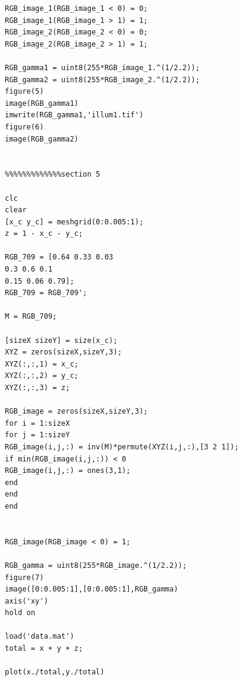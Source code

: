 \documentclass[paper=a4, fontsize=11pt]{scrartcl} %
\numberwithin{equation}{section} %
\numberwithin{figure}{section} %
\numberwithin{table}{section} %
\begin{document}
\begin{lstlisting}[frame=single]
RGB_image_1(RGB_image_1 < 0) = 0;
RGB_image_1(RGB_image_1 > 1) = 1;
RGB_image_2(RGB_image_2 < 0) = 0;
RGB_image_2(RGB_image_2 > 1) = 1;

RGB_gamma1 = uint8(255*RGB_image_1.^(1/2.2));
RGB_gamma2 = uint8(255*RGB_image_2.^(1/2.2));
figure(5)
image(RGB_gamma1)
imwrite(RGB_gamma1,'illum1.tif')
figure(6)
image(RGB_gamma2)


%%%%%%%%%%%%%section 5

clc
clear
[x_c y_c] = meshgrid(0:0.005:1);
z = 1 - x_c - y_c;

RGB_709 = [0.64 0.33 0.03
0.3 0.6 0.1
0.15 0.06 0.79];
RGB_709 = RGB_709';

M = RGB_709;

[sizeX sizeY] = size(x_c);
XYZ = zeros(sizeX,sizeY,3);
XYZ(:,:,1) = x_c;
XYZ(:,:,2) = y_c;
XYZ(:,:,3) = z;

RGB_image = zeros(sizeX,sizeY,3);
for i = 1:sizeX
for j = 1:sizeY
RGB_image(i,j,:) = inv(M)*permute(XYZ(i,j,:),[3 2 1]);
if min(RGB_image(i,j,:)) < 0
RGB_image(i,j,:) = ones(3,1);
end
end
end


RGB_image(RGB_image < 0) = 1;

RGB_gamma = uint8(255*RGB_image.^(1/2.2));
figure(7)
image([0:0.005:1],[0:0.005:1],RGB_gamma)
axis('xy')
hold on

load('data.mat')
total = x + y + z;

plot(x./total,y./total)







\end{lstlisting}
\end{document}
